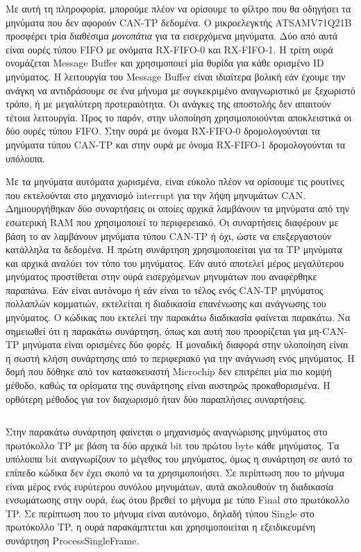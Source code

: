 \documentclass[a4paper,nobib,justified]{tufte-book}
\begin{document}
Με αυτή τη πληροφορία, μπορούμε πλέον να ορίσουμε το φίλτρο που θα οδηγήσει τα μηνύματα που δεν αφορούν CAN-TP δεδομένα. Ο μικροελεγκτής ATSAMV71Q21B προσφέρει τρία διαθέσιμα \textit{μονοπάτια} για τα εισερχόμενα μηνύματα. Δύο από αυτά είναι ουρές τύπου FIFO με ονόματα RX-FIFO-0 και RX-FIFO-1. Η τρίτη ουρά ονομάζεται Message Buffer και χρησιμοποιεί μία θυρίδα για κάθε ορισμένο ID μηνύματος. Η λειτουργία του Message Buffer είναι ιδιαίτερα βολική εάν έχουμε την ανάγκη να αντιδράσουμε σε ένα μήνυμα με συγκεκριμένο αναγνωριστικό με ξεχωριστό τρόπο, ή με μεγαλύτερη προτεραιότητα. Οι ανάγκες της αποστολής δεν απαιτούν τέτοια λειτουργία. Προς το παρόν, στην υλοποίηση χρησιμοποιούνται αποκλειστικά οι δύο ουρές τύπου FIFO. Στην ουρά με όνομα RX-FIFO-0 δρομολογούνται τα μηνύματα τύπου CAN-TP και στην ουρά με όνομα RX-FIFO-1 δρομολογούνται τα υπόλοιπα.

Με τα μηνύματα αυτόματα χωρισμένα, είναι εύκολο πλέον να ορίσουμε τις ρουτίνες που εκτελούνται στο μηχανισμό interrupt για την λήψη μηνυμάτων CAN. Δημιουργήθηκαν δύο συναρτήσεις οι οποίες αρχικά λαμβάνουν τα μηνύματα από την εσωτερική RAM που χρησιμοποιεί το περιφερειακό. Οι συναρτήσεις διαφέρουν με βάση το αν λαμβάνουν μηνύματα τύπου CAN-TP ή όχι, ώστε να επεξεργαστούν κατάλληλα τα δεδομένα. Η πρώτη συνάρτηση χρησιμοποιείται για τα TP μηνύματα και αρχικά αναλύει τον τύπο του μηνύματος. Εάν αυτό αποτελεί μέρος μεγαλύτερου μηνύματος προστίθεται στην ουρά εισερχόμενων μηνυμάτων που αναφέρθηκε παραπάνω. Εάν είναι αυτόνομο ή εάν είναι το τέλος ενός CAN-TP μηνύματος πολλαπλών κομματιών, εκτελείται η διαδικασία επανένωσης και ανάγνωσης του μηνύματος. Ο κώδικας που εκτελεί την παρακάτω διαδικασία φαίνεται παρακάτω. Να σημειωθεί ότι η παρακάτω συνάρτηση, όπως και αυτή που προορίζεται για μη-CAN-TP μηνύματα είναι ορισμένες δύο φορές. Η μοναδική διαφορά στην υλοποίηση είναι η σωστή κλήση συνάρτησης από το περιφεριακό για την ανάγνωση ενός μηνύματος. Η δομή που δόθηκε από τον κατασκευαστή Microchip δεν επιτρέπει μία πιο κομψή μέθοδο, καθώς τα ορίσματα της συνάρτησης είναι αυστηρώς προκαθορισμένα. Η ορθότερη μέθοδος για τον διαχωρισμό ήταν δύο παραπλήσιες συναρτήσεις.
\inputminted{c++}{code/examples/driver-tp-message-receiver.cpp}

Στην παρακάτω συνάρτηση φαίνεται ο μηχανισμός αναγνώρισης μηνύματος στο πρωτόκολλο TP με βάση τα δύο αρχικά bit του πρώτου byte κάθε μηνύματος. Τα υπόλοιπα bit αναγνωρίζουν το μέγεθος του μηνύματος, όμως η συνάρτηση σε αυτό το επίπεδο κώδικα δεν έχει σκοπό να τα χρησιμοποιήσει. Σε περίπτωση που το μήνυμα είναι μέρος ενός ευρύτερου συνόλου μηνυμάτων, αυτά ακολουθούν τη διαδικασία ενσωμάτωσης στην ουρά, έως ότου βρεθεί το μήνυμα με τύπο Final στο πρωτόκολλο TP. Σε περίπτωση που το μήνυμα είναι αυτόνομο, δηλαδή τύπου Single στο πρωτόκολλο TP, η ουρά παρακάμπτεται και χρησιμοποιείται η εξειδικευμένη συνάρτηση ProcessSingleFrame\(\).
\end{document}
